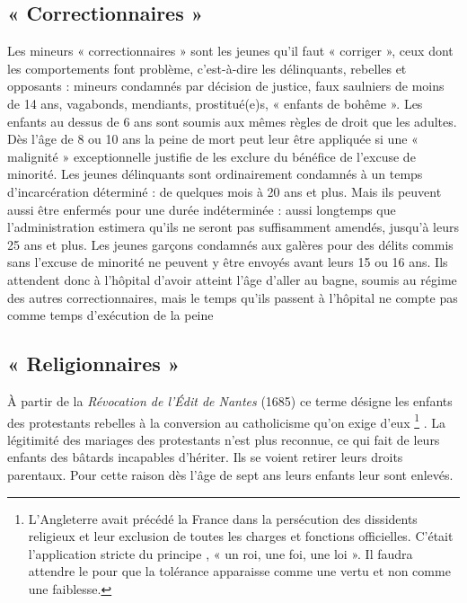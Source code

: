 \subsection{« Correctionnaires »}

Les mineurs « correctionnaires » sont les jeunes qu'il faut « corriger », ceux dont les comportements font problème, c'est-à-dire les délinquants, rebelles et opposants : mineurs condamnés par décision de justice, faux saulniers de moins de 14 ans, vagabonds, mendiants, prostitué(e)s, « enfants de bohême ». Les enfants au dessus de 6 ans sont soumis aux mêmes règles de droit que les adultes. Dès l'âge de 8 ou 10 ans la peine de mort peut leur être appliquée si une « malignité » exceptionnelle justifie de les exclure du bénéfice de l'excuse de minorité. Les jeunes délinquants sont ordinairement condamnés à un temps d'incarcération déterminé : de quelques mois à 20 ans et plus. Mais ils peuvent aussi être enfermés pour une durée indéterminée : aussi longtemps que l'administration estimera qu'ils ne seront pas suffisamment amendés, jusqu'à leurs 25 ans et plus. Les jeunes garçons condamnés aux galères pour des délits commis sans l'excuse de minorité ne peuvent y être envoyés avant leurs 15 ou 16 ans. Ils attendent donc à l'hôpital d'avoir atteint l'âge d'aller au bagne, soumis au régime des autres correctionnaires, mais le temps qu'ils passent à l'hôpital ne compte pas comme temps d'exécution de la peine

\subsection{« Religionnaires »}

À partir de la \emph{Révocation de l'Édit de Nantes} (1685) ce terme désigne les enfants des protestants rebelles à la conversion au catholicisme qu'on exige d'eux%
\footnote{L'Angleterre avait précédé la France dans la persécution des dissidents religieux et leur exclusion de toutes les charges et fonctions officielles. C'était l'application stricte du principe , « {un roi, une foi, une loi} ». Il faudra attendre le  pour que la tolérance apparaisse comme une vertu et non comme une faiblesse.}%
. La légitimité des mariages des protestants n'est plus reconnue, ce qui fait de leurs enfants des bâtards incapables d'hériter. Ils se voient retirer leurs droits parentaux. Pour cette raison dès l'âge de sept ans leurs enfants leur sont enlevés. 

